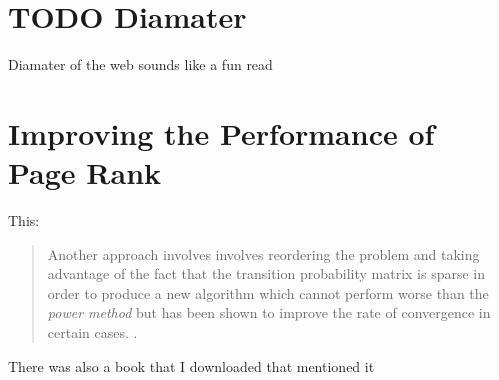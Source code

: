 \documentclass[11pt]{article}
\begin{document}
\section{TODO Diamater}
\label{sec:org027098e}
Diamater of the web sounds like a fun read \cite{albertDiameterWorldWideWeb1999}
\section{Improving the Performance of Page Rank}
\label{sec:org14544c9}

This:

\begin{quote}
Another approach involves involves reordering the problem and taking advantage
of the fact that the transition probability matrix is sparse  in order
to produce a new algorithm which cannot perform worse than the \emph{power method}
but has been shown to improve the rate of convergence in certain cases.
\cite{langvilleReorderingPageRankProblem2006}.
\end{quote}


There was also a book that I downloaded that mentioned it
\end{document}
